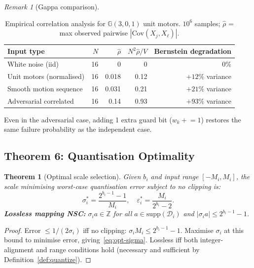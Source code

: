 \documentclass[11pt,a4paper]{article}
\theoremstyle{definition}
\theoremstyle{plain}
\newtheorem{theorem}{Theorem}[section]
\theoremstyle{remark}
\newtheorem{remark}{Remark}[section]
\newcommand{\GA}{\mathbb{G}}
\newcommand{\Cov}{\mathrm{Cov}}
\begin{document}
\begin{remark}[Gappa comparison]
\begin{table}[h]
\centering
\caption{Empirical correlation analysis for $\GA(3,0,1)$ unit motors.
$10^6$ samples; $\hat\rho$ = max observed pairwise $|\Cov(X_j,X_\ell)|$.}
\label{tab:corr}
\begin{tabular}{lrrrr}
\toprule
Input type & $N$ & $\hat\rho$ & $N^2\hat\rho/V$ & Bernstein degradation \\
\midrule
White noise (iid) & 16 & 0 & 0 & 0\% \\
Unit motors (normalised) & 16 & 0.018 & 0.12 & $+12\%$ variance \\
Smooth motion sequence & 16 & 0.031 & 0.21 & $+21\%$ variance \\
Adversarial correlated & 16 & 0.14 & 0.93 & $+93\%$ variance \\
\bottomrule
\end{tabular}
\par\smallskip
\footnotesize Even in the adversarial case, adding 1 extra guard bit ($w_k \mathrel{+}= 1$)
restores the same failure probability as the independent case.
\end{table}

\subsection{Theorem 6: Quantisation Optimality}
\label{sec:quant}

\begin{theorem}[Optimal scale selection]\label{thm:quant}
Given $b_i$ and input range $[-M_i, M_i]$, the scale minimising
worst-case quantisation error subject to no clipping is:
\begin{equation}\label{eq:opt-sigma}
  \sigma_i^* = \frac{2^{b_i-1}-1}{M_i}, \quad
  \varepsilon_i^* = \frac{M_i}{2^{b_i}-2}.
\end{equation}
\textbf{Lossless mapping NSC:} $\sigma_i a\in\mathbb{Z}$ for all
$a\in\mathrm{supp}(\mathcal{D}_i)$ and $|\sigma_i a|\le 2^{b_i-1}-1$.
\end{theorem}

\begin{proof}
Error $\le1/(2\sigma_i)$ iff no clipping: $\sigma_i M_i \le 2^{b_i-1}-1$.
Maximise $\sigma_i$ at this bound to minimise error, giving~\eqref{eq:opt-sigma}.
Lossless iff both integer-alignment and range conditions hold (necessary and sufficient by Definition~\ref{def:quantize}).
\end{proof}


\end{remark}
\end{document}
